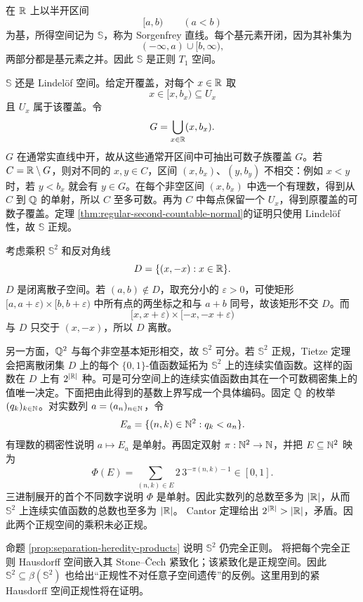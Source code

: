 \begin{example}
\label{ex:sorgenfrey-plane-not-normal}
在 \(\mathbb{R}\) 上以半开区间
\[
 [a,b)\qquad(a<b)
\]
为基，所得空间记为 \(\mathbb S\)，称为 Sorgenfrey 直线。每个基元素开闭，因为其补集为
\[
 (-\infty,a)\cup[b,\infty),
\]
两部分都是基元素之并。因此 \(\mathbb S\) 是正则 \(T_1\) 空间。

\(\mathbb S\) 还是 Lindelöf 空间。给定开覆盖，对每个 \(x\in\mathbb{R}\) 取
\[
 x\in[x,b_x)\subseteq U_x
\]
且 \(U_x\) 属于该覆盖。令
\[
 G=\bigcup_{x\in\mathbb{R}}(x,b_x).
\]
\(G\) 在通常实直线中开，故从这些通常开区间中可抽出可数子族覆盖 \(G\)。若 \(C=\mathbb{R}\setminus G\)，则对不同的 \(x,y\in C\)，区间
\((x,b_x)\)、\((y,b_y)\) 不相交：例如 \(x<y\) 时，若 \(y<b_x\) 就会有 \(y\in G\)。在每个非空区间 \((x,b_x)\) 中选一个有理数，得到从 \(C\) 到 \(\mathbb{Q}\) 的单射，所以 \(C\) 至多可数。再为 \(C\) 中每点保留一个 \(U_x\)，得到原覆盖的可数子覆盖。定理
\ref{thm:regular-second-countable-normal}的证明只使用 Lindelöf 性，故
\(\mathbb S\) 正规。

考虑乘积 \(\mathbb S^2\) 和反对角线
\[
 D=\{(x,-x):x\in\mathbb{R}\}.
\]
\(D\) 是闭离散子空间。若 \((a,b)\notin D\)，取充分小的
\(\varepsilon>0\)，可使矩形
\([a,a+\varepsilon)\times[b,b+\varepsilon)\) 中所有点的两坐标之和与 \(a+b\) 同号，故该矩形不交 \(D\)。而
\[
 [x,x+\varepsilon)\times[-x,-x+\varepsilon)
\]
与 \(D\) 只交于 \((x,-x)\)，所以 \(D\) 离散。

另一方面，\(\mathbb{Q}^2\) 与每个非空基本矩形相交，故 \(\mathbb S^2\) 可分。若
\(\mathbb S^2\) 正规，Tietze 定理会把离散闭集 \(D\) 上的每个
\(\{0,1\}\)-值函数延拓为 \(\mathbb S^2\) 上的连续实值函数。这样的函数在 \(D\) 上有
\(2^{|\mathbb{R}|}\) 种。可是可分空间上的连续实值函数由其在一个可数稠密集上的
值唯一决定。下面把由此得到的基数上界写成一个具体编码。固定 \(\mathbb{Q}\) 的枚举
\((q_k)_{k\in\mathbb{N}}\)。对实数列 \(a=(a_n)_{n\in\mathbb{N}}\)，令
\[
 E_a=\{(n,k)\in\mathbb{N}^2:q_k<a_n\}.
\]
有理数的稠密性说明 \(a\mapsto E_a\) 是单射。再固定双射
\(\pi:\mathbb{N}^2\to\mathbb{N}\)，并把 \(E\subseteq\mathbb{N}^2\) 映为
\[
 \Phi(E)=\sum_{(n,k)\in E}2\,3^{-\pi(n,k)-1}\in[0,1].
\]
三进制展开的首个不同数字说明 \(\Phi\) 是单射。因此实数列的总数至多为
\(|\mathbb{R}|\)，从而 \(\mathbb S^2\) 上连续实值函数的总数也至多为 \(|\mathbb{R}|\)。
Cantor 定理给出 \(2^{|\mathbb{R}|}>|\mathbb{R}|\)，矛盾。因此两个正规空间的乘积未必正规。
\end{example}

命题 \ref{prop:separation-heredity-products} 说明 \(\mathbb S^2\) 仍完全正则。
将把每个完全正则 Hausdorff 空间嵌入其 Stone--Čech 紧致化；该紧致化是正规空间。因此
\(\mathbb S^2\subseteq\beta(\mathbb S^2)\) 也给出“正规性不对任意子空间遗传”的反例。这里用到的紧 Hausdorff 空间正规性将在证明。

